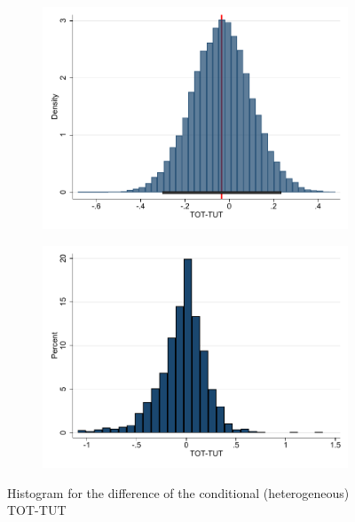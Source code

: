 \documentclass[oneside,11pt]{article}
\begin{document}
\begin{figure}[H]
\begin{center}
\begin{subfigure}{0.45\textwidth}
        \centering
        \includegraphics[width=\textwidth]{Figuras/tot_tut_btsp3.pdf}
    \end{subfigure}
  
    \end{center}
     \scriptsize   
\end{figure}





\begin{figure}[H]
     \caption{TOT-TUT Histogram}
    \label{}
    \begin{center}
    \begin{subfigure}{0.5\textwidth}
        \centering
        \includegraphics[width=\textwidth]{Figuras/dif_tot_tut.pdf}
    \end{subfigure}
    \end{center}
    \scriptsize
        Histogram for the difference of the conditional (heterogeneous) TOT-TUT
\end{figure}
\end{document}
